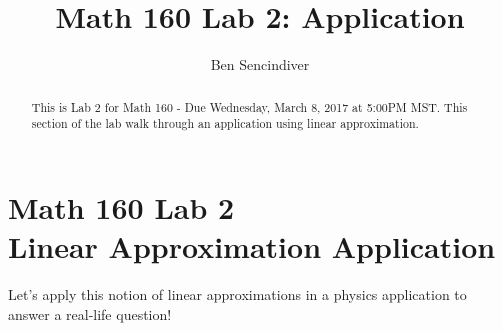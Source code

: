 \documentclass[handout,nooutcomes]{ximera}
\title{Math 160 Lab 2: Application}
\author{Ben Sencindiver} %
\begin{document}
\section{Math 160 Lab 2 \\ Linear Approximation Application}

\begin{abstract}
This is Lab 2 for Math 160 - Due Wednesday, March 8, 2017 at 5:00PM MST.
This section of the lab walk through an application using linear approximation.
\end{abstract}

\maketitle



Let's apply this notion of linear approximations in a physics application to
answer a real-life question!\\
\end{document}
